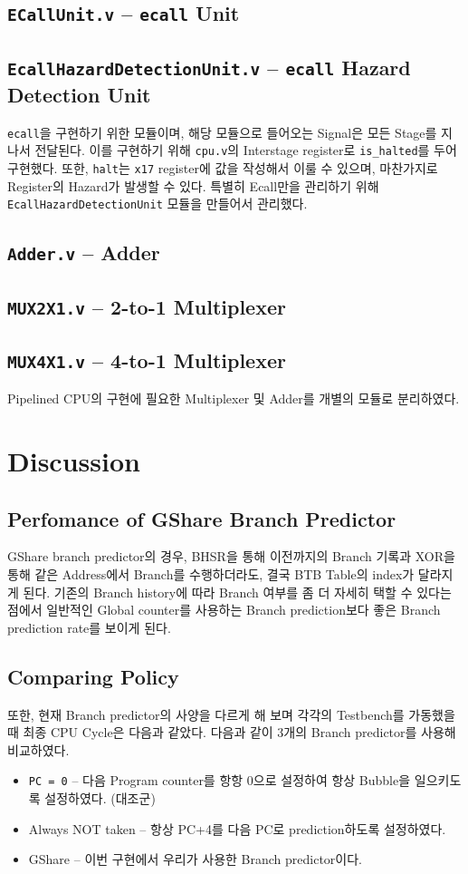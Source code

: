 \documentclass{scrartcl}
\begin{document}
\subsection{\texttt{ECallUnit.v} -- \texttt{ecall} Unit}
\subsection{\texttt{EcallHazardDetectionUnit.v} -- \texttt{ecall} Hazard Detection Unit}
\texttt{ecall}을 구현하기 위한 모듈이며, 해당 모듈으로 들어오는 Signal은 모든 Stage를 지나서 전달된다. 이를 구현하기 위해 \texttt{cpu.v}의 Interstage register로 \texttt{is\_halted}를 두어 구현했다.
또한, \texttt{halt}는 \texttt{x17} register에 값을 작성해서 이룰 수 있으며, 마찬가지로 Register의 Hazard가 발생할 수 있다. 특별히 Ecall만을 관리하기 위해 \texttt{EcallHazardDetectionUnit} 모듈을 만들어서 관리했다.

\subsection{\texttt{Adder.v} -- Adder}
\subsection{\texttt{MUX2X1.v} -- 2-to-1 Multiplexer}
\subsection{\texttt{MUX4X1.v} -- 4-to-1 Multiplexer}
Pipelined CPU의 구현에 필요한 Multiplexer 및 Adder를 개별의 모듈로 분리하였다.

\section{Discussion}
\subsection{Perfomance of GShare Branch Predictor}
GShare branch predictor의 경우, BHSR을 통해 이전까지의 Branch 기록과 XOR을 통해 같은 Address에서 Branch를 수행하더라도, 결국 BTB Table의 index가 달라지게 된다.
기존의 Branch history에 따라 Branch 여부를 좀 더 자세히 택할 수 있다는 점에서 일반적인 Global counter를 사용하는 Branch prediction보다 좋은 Branch prediction rate를 보이게 된다.

\subsection{Comparing Policy}
또한, 현재 Branch predictor의 사양을 다르게 해 보며 각각의 Testbench를 가동했을 때 최종 CPU Cycle은 다음과 같았다.
다음과 같이 3개의 Branch predictor를 사용해 비교하였다.
\begin{itemize}
  \item \texttt{PC = 0} -- 다음 Program counter를 항항 0으로 설정하여 항상 Bubble을 일으키도록 설정하였다. (대조군)
  \item Always NOT taken -- 항상 PC+4를 다음 PC로 prediction하도록 설정하였다.
  \item GShare -- 이번 구현에서 우리가 사용한 Branch predictor이다.
\end{itemize}
\end{document}
